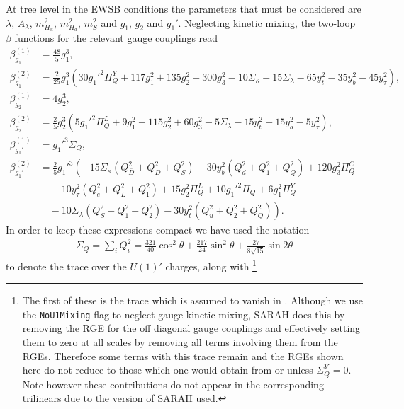 \documentclass[preprint,amsmath,amssymb,aps,superscriptaddress,prd,
showpacs,floatfix,nofootinbib]{revtex4-1}
\begin{document}
At tree level in the EWSB conditions the parameters that must be considered
are $\lambda$, $A_\lambda$, $m_{H_u}^2$, $m_{H_d}^2$, $m_S^2$ and $g_1$, $g_2$
and $g_1'$.  Neglecting kinetic mixing, the two-loop $\beta$ functions for
the relevant gauge couplings read
\begin{subequations} \label{eq:USSMGaugeBetas}
\begin{align}
\beta_{g_1}^{(1)} &= \frac{48}{5} g_1^3 , \label{eq:USSMg1BetaOneLoop} \\
\beta_{g_1}^{(2)} &= \frac{2}{25} g_1^3 \left ( 30 g_1'^2 \Pi_{Q}^Y +
117 g_1^2 + 135 g_2^2 + 300 g_3^2 - 10 \Sigma_{\kappa } - 15 \Sigma_{\lambda }
- 65 y_t^2 - 35 y_b^2 - 45 y_{\tau }^2 \right ) , \label{eq:USSMg1BetaTwoLoop}\\
\beta_{g_2}^{(1)} &= 4 g_2^3 , \label{eq:USSMg2BetaOneLoop} \\
\beta_{g_2}^{(2)} &= \frac{2}{5} g_2^3 \left ( 5 g_1'^2 \Pi _{Q}^L + 9 g_1^2
+ 115 g_2^2 + 60 g_3^2 - 5 \Sigma_{\lambda } - 15 y_t^2 - 15 y_b^2 -
5 y_{\tau }^2 \right) , \label{eq:USSMg2BetaTwoLoop} \\
\beta_{g_1'}^{(1)} &= g_1'^3 \Sigma_{Q} , \label{eq:USSMg1pBetaOneLoop} \\
\beta_{g_1'}^{(2)} &= \frac{2}{5} g_1'^3 \left ( -15 \Sigma_{\kappa } \left (
Q_{\bar{D}}^2 + Q_D^2 + Q_S^2 \right ) - 30 y_b^2 \left ( Q_d^2 + Q_1^2 +
Q_Q^2 \right ) + 120 g_3^2 \Pi_{Q}^C \right . \nonumber \\
& \quad {} - 10 y_{\tau }^2 \left ( Q_e^2 + Q_L^2 + Q_1^2 \right ) +
15 g_2^2 \Pi_{Q}^L + 10 g_1'^2 \Pi_{Q} + 6 g_1^2 \Pi_{Q}^Y \nonumber \\
& \quad \left . {} - 10 \Sigma_{\lambda } \left ( Q_S^2 + Q_1^2 + Q_2^2
\right ) - 30 y_t^2 \left ( Q_u^2 + Q_2^2 + Q_Q^2 \right ) \right ) .
\label{eq:USSMg1pBetaTwoLoop}
\end{align}
\end{subequations}
In order to keep these expressions compact we have used the notation
\begin{align*}
\Sigma_{Q} = \sum_i Q_i^2 = \frac{321}{40} \cos^2\theta +
\frac{217}{24} \sin^2\theta + \frac{27}{8 \sqrt{15}} \sin 2\theta
\end{align*}
to denote the trace over the $U(1)'$ charges, along
with \footnote{The first of these is the trace which is assumed to vanish in
\cite{Martin:1993zk}.  Although we use the \texttt{NoU1Mixing} flag to neglect
gauge kinetic mixing, SARAH does this by removing the RGE for
the off diagonal gauge couplings and effectively setting them to
zero at all scales by removing all terms involving them from the
RGEs.  Therefore some terms with this trace remain and the RGEs shown here
do not reduce to those which one would obtain from
\cite{Martin:1993zk} or \cite{Athron:2009bs} unless $\Sigma_{Q}^Y = 0$.
Note however these contributions do not appear in the
corresponding trilinears due to the version of SARAH used.}
\end{document}
